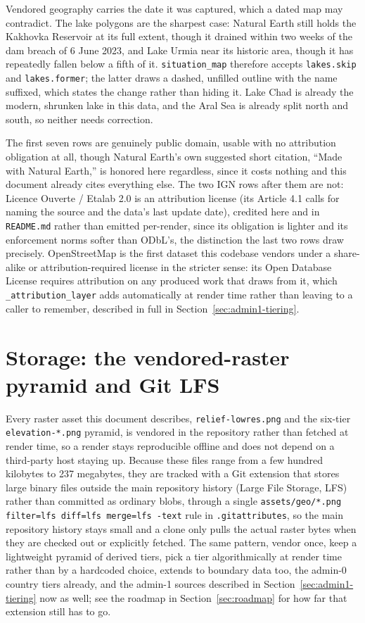 \documentclass[11pt]{article}
\begin{document}
Vendored geography carries the date it was captured, which a dated map
may contradict. The lake polygons are the sharpest case: Natural Earth
still holds the Kakhovka Reservoir at its full extent, though it drained
within two weeks of the dam breach of 6 June 2023, and Lake Urmia near its
historic area, though it has repeatedly fallen below a fifth of it.
\texttt{situation\_map} therefore accepts \texttt{lakes.skip} and
\texttt{lakes.former}; the latter draws a dashed, unfilled outline with the
name suffixed, which states the change rather than hiding it. Lake Chad is
already the modern, shrunken lake in this data, and the Aral Sea is already
split north and south, so neither needs correction.

The first seven rows are genuinely public domain, usable with no
attribution obligation at all, though Natural Earth's own suggested
short citation, ``Made with Natural Earth,'' is honored here
regardless, since it costs nothing and this document already cites
everything else. The two IGN rows after them are not: Licence Ouverte
/ Etalab 2.0 is an attribution license (its Article 4.1 calls for
naming the source and the data's last update date), credited here and
in \texttt{README.md} rather than emitted per-render, since its
obligation is lighter and its enforcement norms softer than ODbL's,
the distinction the last two rows draw precisely. OpenStreetMap is the
first dataset this codebase vendors under a share-alike or
attribution-required license in the stricter sense: its Open Database
License requires attribution on any produced work that draws from it,
which \texttt{\_attribution\_layer} adds automatically at render time
rather than leaving to a caller to remember, described in full in
Section~\ref{sec:admin1-tiering}.

\section{Storage: the vendored-raster pyramid and Git LFS}

Every raster asset this document describes, \texttt{relief-lowres.png}
and the six-tier \texttt{elevation-*.png} pyramid, is vendored in the
repository rather than fetched at render time, so a render stays
reproducible offline and does not depend on a third-party host staying
up. Because these files range from a few hundred kilobytes to 237
megabytes, they are tracked with a Git extension that stores large
binary files outside the main repository history (Large File Storage,
LFS) rather than committed as ordinary blobs, through a single
\texttt{assets/geo/*.png filter=lfs diff=lfs merge=lfs -text} rule in
\texttt{.gitattributes}, so the main repository history stays small and
a clone only pulls the actual raster bytes when they are checked out or
explicitly fetched. The same pattern, vendor once, keep a lightweight
pyramid of derived tiers, pick a tier algorithmically at render time
rather than by a hardcoded choice, extends to boundary data too, the
admin-0 country tiers already, and the admin-1 sources described in
Section~\ref{sec:admin1-tiering} now as well; see the roadmap in
Section~\ref{sec:roadmap} for how far that extension still has to go.
\end{document}

